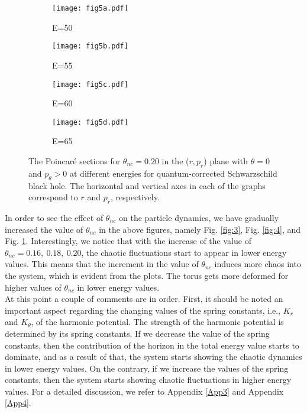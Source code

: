 \documentclass[aps,prd,showpacs,nofootinbib,floats,floatfix,preprintnumbers,groupedaddress,twocolumn]{revtex4-1}
\begin{document}
%
%
%
%
\begin{figure}[hbt!]
	\centering
	\begin{subfigure}[b]{0.4\linewidth}
		\texttt{[image: fig5a.pdf]}
		\caption{E=50}
	\end{subfigure}
	\begin{subfigure}[b]{0.4\linewidth}
		\texttt{[image: fig5b.pdf]}
		\caption{E=55}
	\end{subfigure}
	\begin{subfigure}[b]{0.4\linewidth}
		\texttt{[image: fig5c.pdf]}
		\caption{E=60}
	\end{subfigure}
	\begin{subfigure}[b]{0.4\linewidth}
		\texttt{[image: fig5d.pdf]}
		\caption{E=65}
	\end{subfigure}
	\caption{The Poincar\'e sections for $\theta_{nc} = 0.20$ in the ($r,p_r$) plane with $\theta = 0$ and $p_\theta > 0$ at different energies for quantum-corrected Schwarzschild black hole. The horizontal and vertical axes in each of the graphs correspond to $r$ and $p_r$, respectively.}
	\label{fig:5}
\end{figure}
%
%
%
%
\par\noindent
In order to see the effect of $\theta_{nc}$ on the particle dynamics, we have gradually increased the value of $\theta_{nc}$ in the above figures, namely Fig. \ref{fig:3}, Fig. \ref{fig:4}, and Fig. \ref{fig:5}. Interestingly, we notice that with the increase of the value of $\theta_{nc}=0.16,~0.18,~0.20$, the chaotic fluctuations start to appear in lower energy values. This means that the increment in the value of $\theta_{nc}$ induces more chaos into the system, which is evident from the plots. The torus gets more deformed for higher values of $\theta_{nc}$ in  lower energy values. \\
%
%
%
%	
%
At this point a couple of comments are in order.
First, it should be noted an important aspect regarding the changing values of the spring constants, i.e., $K_{r}$ and $K_{\theta}$, of the harmonic potential. The strength of the harmonic potential is determined by its spring constants. If we decrease the value of the spring constants, then the contribution of the horizon in the total energy value starts to dominate, and as a result of that, the system starts showing the chaotic dynamics in lower energy values. On the contrary, if we increase the values of the spring constants, then the  system starts showing chaotic fluctuations in higher energy values. For a detailed discussion, we refer to Appendix \ref{App3} and Appendix \ref{App4}.\\
\end{document}
